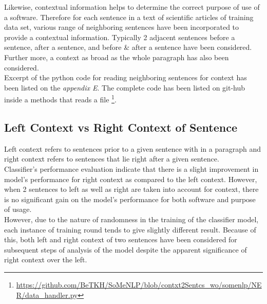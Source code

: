 Likewise, contextual information helps to determine the correct purpose of use of a software. Therefore for each sentence in a text of scientific articles of training data set, various range of neighboring sentences have been incorporated to provide a contextual information. Typically 2 adjacent sentences before a sentence, after a sentence, and before \& after a sentence have been considered. Further more, a context as broad as the whole paragraph has also been considered. \\

Excerpt of the python code for reading neighboring sentences for context has been listed on the \emph{appendix E}. The complete code has been listed on git-hub inside a methods that reads a file  \footnote{\url{https://github.com/BeTKH/SoMeNLP/blob/contxt2Sentcs_wo/somenlp/NER/data_handler.py}}. 

\subsection{Left Context vs Right Context of Sentence}
\label{sec:chapter06:leftvsright}

Left context refers to sentences prior to a given sentence with in  a paragraph and right context refers to sentences that lie right after a given sentence. \\

Classifier’s performance evaluation indicate that there is a slight improvement in model’s performance for right context as compared to the left context. However, when 2 sentences to left as well as right are taken into account for context, there is no significant gain on the model’s performance for both software and purpose of usage. \\

However, due to the nature of randomness in the training of the classifier model, each instance of training round tends to give slightly different result. Because of this, both left and right context of two sentences have been considered for subsequent steps of analysis of the model despite the apparent significance of right context over the left. \\

